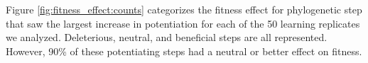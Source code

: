 
Figure \ref{fig:fitness_effect:counts} categorizes the fitness effect for phylogenetic step that saw the largest increase in potentiation for each of the 50 learning replicates we analyzed. 
Deleterious, neutral, and beneficial steps are all represented. 
However, 90\% of these potentiating steps had a neutral or better effect on fitness. 


